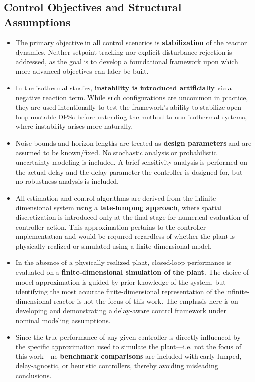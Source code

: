 \subsection*{Control Objectives and Structural Assumptions}

\begin{itemize}
    \item The primary objective in all control scenarios is \textbf{stabilization} of the reactor dynamics. Neither setpoint tracking nor explicit disturbance rejection is addressed, as the goal is to develop a foundational framework upon which more advanced objectives can later be built.

    \item In the isothermal studies, \textbf{instability is introduced artificially} via a negative reaction term. While such configurations are uncommon in practice, they are used intentionally to test the framework’s ability to stabilize open-loop unstable DPSs before extending the method to non-isothermal systems, where instability arises more naturally.

    \item Noise bounds and horizon lengths are treated as \textbf{design parameters} and are assumed to be known/fixed. No stochastic analysis or probabilistic uncertainty modeling is included. A brief sensitivity analysis is performed on the actual delay and the delay parameter the controller is designed for, but no robustness analysis is included.
    
    \item All estimation and control algorithms are derived from the infinite-dimensional system using a \textbf{late-lumping approach}, where spatial discretization is introduced only at the final stage for numerical evaluation of controller action. This approximation pertains to the controller implementation and would be required regardless of whether the plant is physically realized or simulated using a finite-dimensional model.

    \item In the absence of a physically realized plant, closed-loop performance is evaluated on a \textbf{finite-dimensional simulation of the plant}. The choice of model approximation is guided by prior knowledge of the system, but identifying the most accurate finite-dimensional representation of the infinite-dimensional reactor is not the focus of this work. The emphasis here is on developing and demonstrating a delay-aware control framework under nominal modeling assumptions.

    \item Since the true performance of any given controller is directly influenced by the specific approximation used to simulate the plant---i.e. not the focus of this work---no \textbf{benchmark comparisons} are included with early‑lumped, delay‑agnostic, or heuristic controllers, thereby avoiding misleading conclusions.

\end{itemize}


